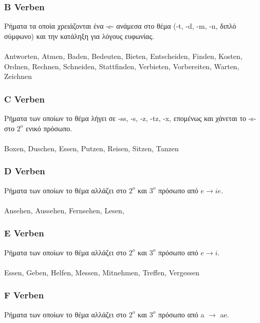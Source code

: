 \begin{appendix}
 \subsubsection{B Verben}
 Ρήματα τα οποία χρειάζονται ένα -e- ανάμεσα στο θέμα (-t, -d, -m, -n, διπλό σύμφωνο) και την κατάληξη για λόγους ευφωνίας. \\ \newline
  \\ \newline
 \gls{Antworten}, \gls{Atmen}, \gls{Baden}, \gls{Bedeuten}, \gls{Bieten}, \gls{Entscheiden}, \gls{Finden}, \gls{Kosten}, \gls{Ordnen}, \gls{Rechnen}, \gls{Schneiden}, \gls{Stattfinden}, \gls{Verbieten}, \gls{Vorbereiten}, \gls{Warten}, \gls{Zeichnen}
 
 \subsubsection{C Verben}
 Ρήματα των οποίων το θέμα λήγει σε -ss, -s, -z, -tz, -x, επομένως και χάνεται το -s- στο $2^o$ ενικό πρόσωπο. \\
  \\ \newline
 \gls{Boxen}, \gls{Duschen}, \gls{Essen}, \gls{Putzen}, \gls{Reisen},
\gls{Sitzen}, \gls{Tanzen} 
 
 \subsubsection{D Verben}
 Ρήματα των οποίων το θέμα αλλάζει στο $2^o$ και $3^ο$ πρόσωπο από $e \rightarrow ie$. \\
  \\
 
 \gls{Ansehen}, \gls{Aussehen}, \gls{Fernsehen}, \gls{Lesen}, 
 
 \subsubsection{E Verben}
 Ρήματα των οποίων το θέμα αλλάζει στο $2^o$ και $3^ο$ πρόσωπο από $e \rightarrow i$. \\
  \\
 
 \gls{Essen}, \gls{Geben}, \gls{Helfen}, \gls{Messen}, \gls{Mitnehmen},
\gls{Treffen}, \gls{Vergessen}
 
 \subsubsection{F Verben}
 Ρήματα των οποίων το θέμα αλλάζει στο $2^o$ και $3^ο$ πρόσωπο από a $\rightarrow$ ae. \\
  \\
 

\end{appendix}
